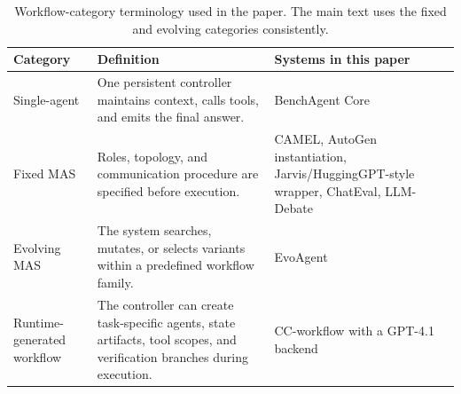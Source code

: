 \begin{table}[t]
    \centering
    \caption{Workflow-category terminology used in the paper. The main text uses the fixed and evolving categories consistently.}
    \label{tab:appendix_workflow_taxonomy}
    \footnotesize
    \setlength{\tabcolsep}{4pt}
    \renewcommand{\arraystretch}{1.1}
    \begin{tabular}{>{\raggedright\arraybackslash}p{} >{\raggedright\arraybackslash}p{} >{\raggedright\arraybackslash}p{}}
        \toprule
        \textbf{Category} & \textbf{Definition} & \textbf{Systems in this paper} \\
        \midrule
        Single-agent & One persistent controller maintains context, calls tools, and emits the final answer. & BenchAgent Core \\
        Fixed MAS & Roles, topology, and communication procedure are specified before execution. & CAMEL, AutoGen instantiation, Jarvis/HuggingGPT-style wrapper, ChatEval, LLM-Debate \\
        Evolving MAS & The system searches, mutates, or selects variants within a predefined workflow family. & EvoAgent \\
        Runtime-generated workflow & The controller can create task-specific agents, state artifacts, tool scopes, and verification branches during execution. & CC-workflow with a GPT-4.1 backend \\
        \bottomrule
    \end{tabular}
\end{table}

